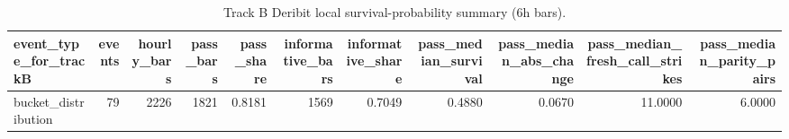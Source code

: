 \begin{table}
\caption{Track B Deribit local survival-probability summary (6h bars).}
\label{tab:trackB_deribit_survival_summary_6h}
\begin{tabular}{lrrrrrrrrrr}
\toprule
event\_type\_for\_trackB & events & hourly\_bars & pass\_bars & pass\_share & informative\_bars & informative\_share & pass\_median\_survival & pass\_median\_abs\_change & pass\_median\_fresh\_call\_strikes & pass\_median\_parity\_pairs \\
\midrule
bucket\_distribution & 79 & 2226 & 1821 & 0.8181 & 1569 & 0.7049 & 0.4880 & 0.0670 & 11.0000 & 6.0000 \\
\bottomrule
\end{tabular}
\end{table}
